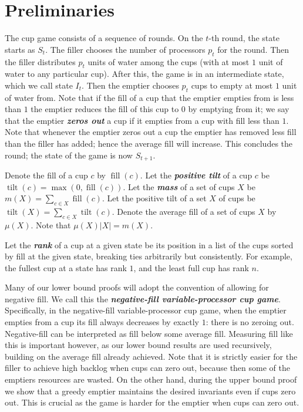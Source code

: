 \documentclass[twocolumn]{article}[10pt]
\newcommand{\defn}[1]{{\textit{\textbf{\boldmath #1}}}\xspace}
\DeclareMathOperator{\tilt}{\text{tilt}}
\DeclareMathOperator{\fil}{\text{fill}}
\begin{document}
\section{Preliminaries}\label{sec:prelims}
The cup game consists of a sequence of rounds. On the $t$-th round, the state
starts as $S_t$. The filler chooses the number of processors $p_t$ for the
round. Then the filler distributes $p_t$ units of water among the cups (with at
most $1$ unit of water to any particular cup). After this, the game is in an
intermediate state, which we call state $I_t$. Then the emptier chooses $p_t$
cups to empty at most $1$ unit of water from. Note that if the fill of a cup
that the emptier empties from is less than $1$ the emptier reduces the fill of
this cup to $0$ by emptying from it; we say that the emptier \defn{zeros out} a
cup if it empties from a cup with fill less than $1$. Note that whenever the
emptier zeros out a cup the emptier has removed less fill than the filler has
added; hence the average fill will increase. This concludes the round; the
state of the game is now $S_{t+1}$.

Denote the fill of a cup $c$ by $\fil(c)$. Let the \defn{positive tilt} of a cup $c$ be
$\tilt(c) = \max(0, \fil(c))$. Let the \defn{mass} of a set of cups $X$
be $m(X) = \sum_{c\in X} \fil(c)$. 
Let the positive tilt of a set $X$ of cups be $\tilt(X) = \sum_{c\in X} \tilt(c)$. 
Denote the average fill of a set of cups $X$
by $\mu(X)$. Note that $\mu(X) |X| = m(X)$.

Let the \defn{rank} of a cup at a given state be its position in a list of the
cups sorted by fill at the given state, breaking ties arbitrarily but
consistently. For example, the fullest cup at a state has rank $1$, and the
least full cup has rank $n$.

Many of our lower bound proofs will adopt the convention of allowing for
negative fill. We call this the \defn{negative-fill variable-processor cup
game}. Specifically, in the negative-fill variable-processor cup game, when the
emptier empties from a cup its fill always decreases by exactly $1$: there is
no zeroing out. Negative-fill can be interpreted as fill below some average
fill. Measuring fill like this is important however, as our lower bound results
are used recursively, building on the average fill already achieved. Note that
it is strictly easier for the filler to achieve high backlog when cups can zero
out, because then some of the emptiers resources are wasted. On the other hand,
during the upper bound proof we show that a greedy emptier maintains the
desired invariants even if cups zero out. This is crucial as the game is harder
for the emptier when cups can zero out.
\end{document}
